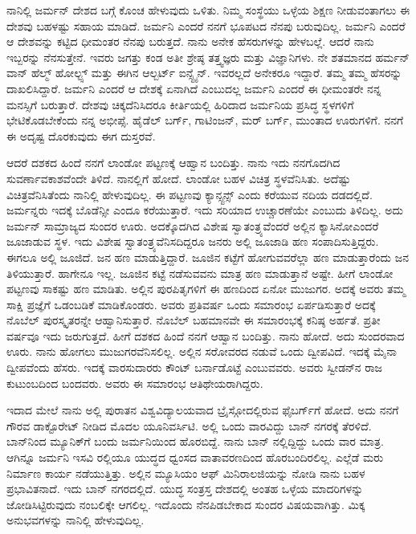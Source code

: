 
ನಾನಿಲ್ಲಿ ಜರ್ಮನ್ ದೇಶದ ಬಗ್ಗೆ ಕೊಂಚ ಹೇಳುವುದು ಒಳಿತು. ನಿಮ್ಮ ಸಂಸ್ಥೆಯು ಒಳ್ಳೆಯ ಶಿಕ್ಷಣ ನೀಡುವಂತಾಗಲು ಈ ದೇಶವು ಬಹಳಷ್ಟು ಸಹಾಯ ಮಾಡಿದೆ. ಜರ್ಮನಿ ಎಂದರೆ ನನಗೆ ಭೂಪಟದ ನೆನಪು ಬರುವುದಿಲ್ಲ. ಜರ್ಮನಿ ಎಂದರೆ ಆ ದೇಶವನ್ನು ಕಟ್ಟಿದ ಧೀಮಂತರ ನೆನಪು ಬರುತ್ತದೆ. ನಾನು ಅನೇಕ ಹೆಸರುಗಳನ್ನು ಹೇಳಬಲ್ಲೆ. ಆದರೆ ನಾನು ಇಬ್ಬರನ್ನು ನೆನಸುತ್ತೇನೆ. ಇವರು ಜಗತ್ತು ಕಂಡ ಅತೀ ಶ್ರೇಷ್ಠ ತತ್ತ್ವಜ್ಞರು ಮತ್ತು ವಿಜ್ಞಾನಿಗಳು.  ನೇ ಶತಮಾನದ ಹರ್ಮನ್ ವಾನ್ ಹೆಲ್ಮ್ ‍ಹೋಲ್ಟ್ಸ್ ಮತ್ತು ಈಗಿನ ಆಲ್ಬರ್ಟ್ ಐನ್ಸ್ಟೈನ್. ಇವರಲ್ಲದೆ ಅನೇಕರೂ ಇದ್ದಾರೆ. ತಮ್ಮ ತಮ್ಮ ಹೆಸರನ್ನು ದಾಖಲಿಸಿದ್ದಾರೆ. ಜರ್ಮನಿ ಎಂದರೆ ಆ ದೇಶಕ್ಕೆ ಏನಾಗಿದೆ ಎಂಬುದಲ್ಲ ಜರ್ಮನಿ ಎಂದರೆ ಈ ಧೀಮಂತರೇ ನನ್ನ ಮನಸ್ಸಿಗೆ ಬರುತ್ತಾರೆ. ದೇಶವು ಚಿಕ್ಕದೆನಿಸಿದರೂ ಕೀರ್ತಿಯಲ್ಲಿ ಹಿರಿದಾದ ಜರ್ಮನಿಯ ಪ್ರಸಿದ್ಧ ಸ್ಥಳಗಳಿಗೆ ಭೇಟಿಕೊಡಬೇಕೆಂದು ನನ್ನ ಅಭೀಪ್ಸೆ. ಹೈಡೆಲ್ ಬರ್ಗ್, ಗಾಟಿಂಜನ್, ಮರ್ ಬರ್ಗ್, ಮುಂತಾದ ಊರುಗಳಿಗೆ. ನನಗೆ ಈ ಅದೃಷ್ಟ ದೊರಕುವುದು ಈಗ ದುಸ್ತರವೆ.

ಆದರೆ ದಶಕದ ಹಿಂದೆ ನನಗೆ ಲಾಂಡೋ ಪಟ್ಟಣಕ್ಕೆ ಆಹ್ವಾನ ಬಂದಿತ್ತು. ನಾನು ಇದು ನನಗೊದಗಿದ ಸುವರ್ಣಾವಕಾಶವೆಂದೇ ತಿಳಿದೆ. ನಾನಲ್ಲಿಗೆ ಹೋದೆ. ಲಾಂಡೋ ಬಹಳ ವಿಚಿತ್ರ ಸ್ಥಳವೆನಿಸಿತು. ಅದೆಷ್ಟು ವಿಚಿತ್ರವೆನಿಸಿತೆಂದು ನಾನಿಲ್ಲಿ ಹೇಳುವುದಿಲ್ಲ. ಈ ಪಟ್ಟಣವು ಕ್ಯಾನ್ಸ್ಟನ್ಸ್ ಎಂದು ಕರೆಯುವ ನದಿಯ ದಡದಲ್ಲಿದೆ. ಜರ್ಮನ್ನರು ಇದಕ್ಕೆ ಬೊಡೆನ್ಸೀ ಎಂದೂ ಕರೆಯುತ್ತಾರೆ. ಇದು ಸರಿಯಾದ ಉಚ್ಚಾರಣೆಯೇ ಎಂಬುದು ತಿಳಿದಿಲ್ಲ. ಅದು ಜರ್ಮನ್ ಸಾಮ್ರಾಜ್ಯದ ಸುಂದರ ಊರು. ಅದಕ್ಕೊದಗಿದ ವಿಶೇಷ ಸ್ವಾತಂತ್ರ್ಯವೆಂದರೆ ಅಲ್ಲಿನ ಕ್ಯಾಸಿನೋ\enginline{-}ಎಂದರೆ ಜೂಜಾಡುವ ಸ್ಥಳ. ಇದು ವಿಶೇಷ ಸ್ವಾತಂತ್ರ್ಯವೆನಿಸದಿದ್ದರೂ ಜನರು ಅಲ್ಲಿ ಜೂಜಾಡಿ ಹಣ ಸಂಪಾದಿಸುತ್ತಿದ್ದರು. ಈಗಲೂ ಅಲ್ಲಿ ಜೂಜಿದೆ. ಜನ ಹಣ ಮಾಡುತ್ತಿದ್ದಾರೆ. ಜೂಜಿನ ಕಟ್ಟೆಗೆ ಹೋಗುವವರೆಲ್ಲಾ ಹಣ ಮಾಡುತ್ತಾರೆಂದು ಜನ ತಿಳಿಯುತ್ತಾರೆ. ಹಾಗೇನೂ ಇಲ್ಲ. ಜೂಜಿನ ಕಟ್ಟೆ ನಡೆಸುವವನು ಮಾತ್ರ ಹಣ ಮಾಡುತ್ತಾನೆ ಅಷ್ಟೇ. ಹೀಗೆ ಲಾಂಡೋ ಪಟ್ಟಣವು ಸಾಕಷ್ಟು ಹಣ ಮಾಡಿತು. ಅಲ್ಲಿನ ಪುರಪಿತೃಗಳಿಗೆ ಈ ಹಣದಿಂದ ಏನೋ ಮುಜುಗರ. ಅದಕ್ಕೆ ಅವರು ತಮ್ಮ ಸಾಕ್ಷಿ ಪ್ರಜ್ಞೆಗೆ ಒಡಂಬಡಿಕೆ ಮಾಡಿಕೊಂಡರು. ಅವರು ಪ್ರತಿವರ್ಷ ಒಂದು ಸಮಾರಂಭ ಏರ್ಪಡಿಸುತ್ತಾರೆ ಅದಕ್ಕೆ ನೊಬೆಲ್ ಪುರಸ್ಕೃತರನ್ನೇ ಆಹ್ವಾನಿಸುತ್ತಾರೆ. ನೊಬೆಲ್ ಬಹಮಾನವೇ ಈ ಸಮಾರಂಭಕ್ಕೆ ಕನಿಷ್ಠ ಅರ್ಹತೆ. ಪ್ರತೀ ವರ್ಷವೂ ಇದು ಜರುಗುತ್ತದೆ. ಹೀಗೆ ದಶಕದ ಹಿಂದೆ ನನಗೆ ಆಹ್ವಾನ ಬಂದಿತ್ತು. ನಾನು ಹೋದೆ. ಅದು ಸುಂದರವಾದ ಊರು. ನಾನು ಹೋಗಲು ಮುಜುಗರವೆನಿಸಲಿಲ್ಲ. ಅಲ್ಲಿನ ಸರೋವರದ ನಡುವೆ ಒಂದು ದ್ವೀಪವಿದೆ. ಇದಕ್ಕೆ ಮೈನಾ ದ್ವೀಪವೆಂದು ಹೆಸರು. ಇದಕ್ಕೆ ವಾರಸುದಾರರು ಕೌಂಟ್ ಬರ್ನಾಡೊಟ್ಟೆ ಎಂಬುವವರು. ಅವರು ಸ್ವೀಡನ್‍ನ ರಾಜ ಕುಟುಂಬದಿಂದ ಬಂದವರು. ಅವರು ಈ ಸಮಾರಂಭ ಆತಿಥೇಯರಾಗಿದ್ದರು.

\vskip 2pt

ಇದಾದ ಮೇಲೆ ನಾನು ಅಲ್ಲಿ ಪುರಾತನ ವಿಶ್ವವಿದ್ಯಾಲಯವಾದ ಬ್ರೈಸ್ಗೋದಲ್ಲಿರುವ ಫೈಬರ್ಗ್‌ಗೆ ಹೋದೆ. ಅದು ನನಗೆ ಗೌರವ ಡಾಕ್ಟೊರೇಟ್ ನೀಡಿದ ಮೊದಲ ಯೂನಿವರ್ಸಿಟಿ. ಅಲ್ಲಿ ಒಂದು ವಾರವಿದ್ದು ಬಾನ್ ನಗರಕ್ಕೆ ತೆರಳಿದೆ. ಬಾನ್‍ನಿಂದ ಮ್ಯೂನಿಕ್‍ಗೆ ಬಂದು ಜರ್ಮನಿಯಿಂದ ಹೊರಬಿದ್ದೆ. ನಾನು ಬಾನ್ ನಲ್ಲಿದ್ದಿದ್ದು ಒಂದು ವಾರ ಮಾತ್ರ. ಆಗಿನ್ನೂ ಜರ್ಮನಿ ಇಸವಿ ರಲ್ಲಿಯೂ ಯುದ್ಧದ ಧ್ವಂಸದ ವಾತಾವರಣದಿಂದ ಹೊರಬಂದಿರಲಿಲ್ಲ. ಎಲ್ಲೆಡೆ ಮರು ನಿರ್ಮಾಣ ಕಾರ್ಯ ನಡೆಯುತ್ತಿತ್ತು. ಅಲ್ಲಿನ ಮ್ಯೂಸಿಯಂ ಆಫ್ ಮಿನಿರಾಲಜಿಯನ್ನು ನೋಡಿ ನಾನು ಬಹಳ ಪ್ರಭಾವಿತನಾದೆ. ಇದು ಬಾನ್ ನಗರದಲ್ಲಿದೆ. ಯುದ್ಧ ಸಂತ್ರಸ್ತ ದೇಶದಲ್ಲಿ ಅಂತಹ ಒಳ್ಳೆಯ ಮಾದರಿಗಳನ್ನು ಜೋಡಿಸಿಟ್ಟಿರುವುದು ನಂಬಲಿಕ್ಕೇ ಆಗಲಿಲ್ಲ. ಇದೊಂದು ನೆನಪಿಡಬೇಕಾದ ಸುಂದರ ವಿಷಯವಾಗಿತ್ತು. ಮಿಕ್ಕ ಅನುಭವಗಳನ್ನು ನಾನಿಲ್ಲಿ ಹೇಳುವುದಿಲ್ಲ.

